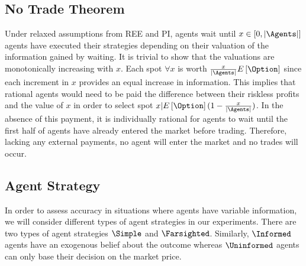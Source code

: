 \subsection{No Trade Theorem}
Under relaxed assumptions from REE and PI, agents wait until $x \in \left[0, |\Agents| \right]$ agents have executed
their strategies depending on their valuation of the information gained by waiting. It is trivial to show that 
the valuations are monotonically increasing with $x$. 
Each spot  $\forall x$ is worth $\frac{x}{|\Agents|} 
E\left[\Option\right]$ since each increment in $x$ provides an equal increase in information. This implies that rational agents
would need to be paid the difference between their riskless profits and the value of $x$ in order to select spot $x | E\left[\Option\right](1 - \frac{x}{|\Agents|})$. In the absence of this payment, it is individually rational for agents to wait until the first half of agents have already entered the market before trading. Therefore, lacking any external payments, no agent will enter the market and no
trades will occur.


\subsection{Agent Strategy}
In order to assess accuracy in situations where agents have variable information, we will consider different types of agent strategies in our experiments. There are two types of agent strategies  $\Simple$ and  $\Farsighted$. Similarly,  $\Informed$ agents have an exogenous belief about the outcome whereas  $\Uninformed$ agents can only base their decision on the market price. \\

